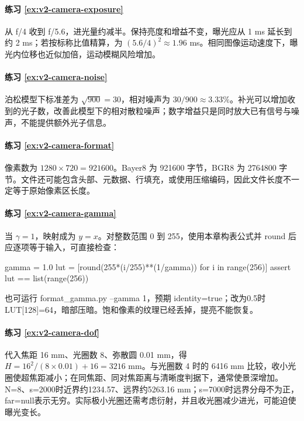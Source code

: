 \paragraph*{练习 \ref{ex:v2-camera-exposure}}
\begin{solution}
从 f/4 收到 f/5.6，进光量约减半。保持亮度和增益不变，曝光应从 1 ms 延长到约 2 ms；若按标称比值精算，为 $(5.6/4)^2\approx1.96$ ms。相同图像运动速度下，曝光内位移也近似加倍，运动模糊风险增加。
\end{solution}

\paragraph*{练习 \ref{ex:v2-camera-noise}}
\begin{solution}
泊松模型下标准差为 $\sqrt{900}=30$，相对噪声为 $30/900\approx3.33\%$。补光可以增加收到的光子数，改善此模型下的相对散粒噪声；数字增益只是同时放大已有信号与噪声，不能提供额外光子信息。
\end{solution}

\paragraph*{练习 \ref{ex:v2-camera-format}}
\begin{solution}
像素数为 $1280\times720=921600$。Bayer8 为 921600 字节，BGR8 为 2764800 字节。文件还可能包含头部、元数据、行填充，或使用压缩编码，因此文件长度不一定等于原始像素区长度。
\end{solution}

\paragraph*{练习 \ref{ex:v2-camera-gamma}}
\begin{solution}
当 $\gamma=1$，映射成为 $y=x$。对整数范围 0 到 255，使用本章构表公式并 round 后应逐项等于输入，可直接检查：
\begin{tpython}
gamma = 1.0
lut = [round(255*(i/255)**(1/gamma)) for i in range(256)]
assert lut == list(range(256))
\end{tpython}
也可运行 format\_gamma.py --gamma 1，预期 identity=true；改为0.5时 LUT[128]=64，暗部压暗。饱和像素的纹理已经丢掉，提亮不能恢复。
\end{solution}

\paragraph*{练习 \ref{ex:v2-camera-dof}}
\begin{solution}
代入焦距 16 mm、光圈数 8、弥散圆 0.01 mm，得 $H=16^2/(8\times0.01)+16=3216$ mm。与光圈数 4 时的 6416 mm 比较，收小光圈使超焦距减小；在同焦距、同对焦距离与清晰度判据下，通常使景深增加。N=8、s=2000时近界约1234.57、远界约5263.16 mm；s=7000时远界分母不为正，far=null表示无穷。实际极小光圈还需考虑衍射，并且收光圈减少进光，可能迫使曝光变长。
\end{solution}

